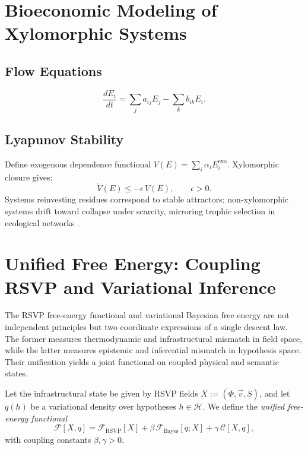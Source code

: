 \documentclass[11pt,a4paper]{article}
\theoremstyle{plain}
\theoremstyle{definition}
\theoremstyle{remark}
\begin{document}
\section{Bioeconomic Modeling of Xylomorphic Systems}
\label{app:bioeconomic}

\subsection{Flow Equations}

\[
  \frac{dE_i}{dt} = \sum_j a_{ij} E_j - \sum_k b_{ik} E_i.
\]

\subsection{Lyapunov Stability}

Define exogenous dependence functional $V(E) = \sum_i \alpha_i E^{\mathrm{exo}}_i$.
Xylomorphic closure gives:
\[
  \dot{V}(E) \leq -\epsilon\,V(E), \qquad \epsilon > 0.
\]
Systems reinvesting residues correspond to stable attractors; non-xylomorphic
systems drift toward collapse under scarcity, mirroring trophic selection in
ecological networks \citep{odum1994,daly2011}.

\newpage
\section{Unified Free Energy: Coupling RSVP and Variational Inference}
\label{app:unified_fe}

The RSVP free-energy functional and variational Bayesian free energy are not
independent principles but two coordinate expressions of a single descent law.
The former measures thermodynamic and infrastructural mismatch in field space,
while the latter measures epistemic and inferential mismatch in hypothesis space.
Their unification yields a joint functional on coupled physical and semantic
states.

Let the infrastructural state be given by RSVP fields
$X := (\Phi, \vec{v}, S)$, and let $q(h)$ be a variational density over
hypotheses $h \in \mathcal{H}$. We define the \emph{unified free-energy
functional}
\[
  \mathcal{F}[X,q]
  =
  \mathcal{F}_{\mathrm{RSVP}}[X]
  +
  \beta\,\mathcal{F}_{\mathrm{Bayes}}[q;X]
  +
  \gamma\,\mathcal{C}[X,q],
\]
with coupling constants $\beta, \gamma > 0$.
\end{document}
